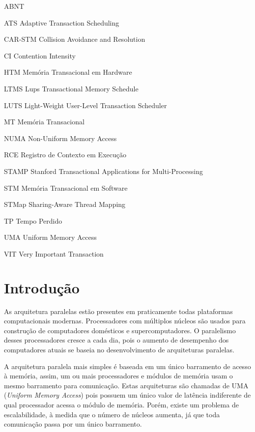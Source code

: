\documentclass[diss,capa]{texufpel}
\begin{document}
\begin{listofabbrv}{ABNT}%
  \item[ATS] \qquad Adaptive Transaction Scheduling
  \item[CAR-STM] \qquad Collision Avoidance and Resolution
  \item[CI] \qquad Contention Intensity
  \item[HTM] \qquad Memória Transacional em Hardware 
  \item[LTMS] \qquad Lups Transactional Memory Schedule
  \item[LUTS] \qquad Light-Weight User-Level Transaction Scheduler
  \item[MT] \qquad Memória Transacional
  \item[NUMA] \qquad Non-Uniform Memory Access
  \item[RCE] \qquad Registro de Contexto em Execução
  \item[STAMP] \qquad Stanford Transactional Applications for Multi-Processing
  \item[STM] \qquad Memória Transacional em Software
  \item[STMap] \qquad Sharing-Aware Thread Mapping
  \item[TP] \qquad Tempo Perdido
  \item[UMA] \qquad Uniform Memory Access
  \item[VIT] \qquad Very Important Transaction
\end{listofabbrv}

\tableofcontents

\chapter{Introdução}

As arquitetura paralelas estão presentes em praticamente todas plataformas computacionais modernas. Processadores com múltiplos núcleos são usados para construção de computadores domésticos e supercomputadores. O paralelismo desses processadores cresce a cada dia, pois o aumento de desempenho dos computadores atuais se baseia no desenvolvimento de arquiteturas paralelas.

A arquitetura paralela mais simples é baseada em um único barramento de acesso à memória, assim, um ou mais processadores e módulos de memória usam o mesmo barramento para comunicação. Estas arquiteturas são chamadas de UMA (\emph{Uniform Memory Access}) pois possuem um único valor de latência indiferente de qual processador acessa o módulo de memória. Porém, existe um problema de escalabilidade, à medida que o número de núcleos aumenta, já que toda comunicação passa por um único barramento.
\end{document}
